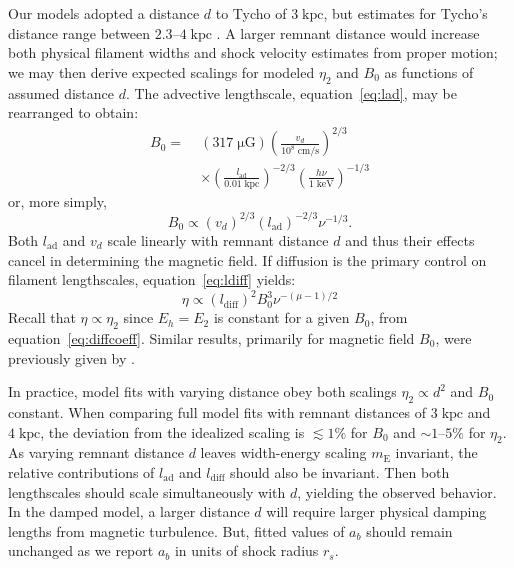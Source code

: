 \documentclass[iop, apj, numberedappendix]{emulateapj}
\newcommand*{\mt}{\mathrm}
\newcommand*{\unit}[1]{\;\mt{#1}}  %
\newcommand*{\abt}{\mathord{\sim}} %
\newcommand*{\mE}{m_\mt{E}}
\newcommand*{\muG}{\unit{\mu G}}
\begin{document}
Our models adopted a distance $d$ to Tycho of $3 \unit{kpc}$, but estimates for
Tycho's distance range between $2.3$--$4 \unit{kpc}$ \citep{hayato2010}.  A
larger remnant distance would increase both physical filament widths and shock
velocity estimates from proper motion; we may then derive expected scalings for
modeled $\eta_2$ and $B_0$ as functions of assumed distance $d$.  The advective
lengthscale, equation~\eqref{eq:lad}, may be rearranged to obtain:
\begin{align}
    B_0 =\; &(317 \muG) \left(\frac{v_d}{10^8 \unit{cm/s}}\right)^{2/3}
                \nonumber \\
            &\times \left(\frac{l_{\mt{ad}}}{0.01 \unit{kpc}}\right)^{-2/3}
                \left(\frac{h\nu}{1 \unit{keV}}\right)^{-1/3}
\end{align}
or, more simply,
\begin{equation}
    B_0 \propto \left(v_d\right)^{2/3}
                \left(l_{\mt{ad}}\right)^{-2/3} \nu^{-1/3} .
\end{equation}
Both $l_{\mt{ad}}$ and $v_d$ scale linearly with remnant distance $d$ and thus
their effects cancel in determining the magnetic field.  If diffusion is the
primary control on filament lengthscales, equation~\eqref{eq:ldiff} yields:
\begin{equation}
    \eta \propto \left(l_{\mt{diff}}\right)^2 B_0^{3} \nu^{-(\mu - 1)/2}
\end{equation}
Recall that $\eta \propto \eta_2$ since $E_h = E_2$ is constant for a given
$B_0$, from equation~\eqref{eq:diffcoeff}.  Similar results, primarily for
magnetic field $B_0$, were previously given by \citet{parizot2006}.

In practice, model fits with varying distance obey both scalings $\eta_2
\propto d^2$ and $B_0$ constant.  When comparing full model fits with remnant
distances of $3 \unit{kpc}$ and $4 \unit{kpc}$, the deviation from the
idealized scaling is $\lesssim 1 \%$ for $B_0$ and $\abt 1$--$5\%$ for
$\eta_2$.  As varying remnant distance $d$ leaves width-energy scaling $\mE$
invariant, the relative contributions of $l_{\mt{ad}}$ and $l_{\mt{diff}}$
should also be invariant.  Then both lengthscales should scale simultaneously
with $d$, yielding the observed behavior.  In the damped model, a larger
distance $d$ will require larger physical damping lengths from magnetic
turbulence.  But, fitted values of $a_b$ should remain unchanged as we report
$a_b$ in units of shock radius $r_s$.
\end{document}

